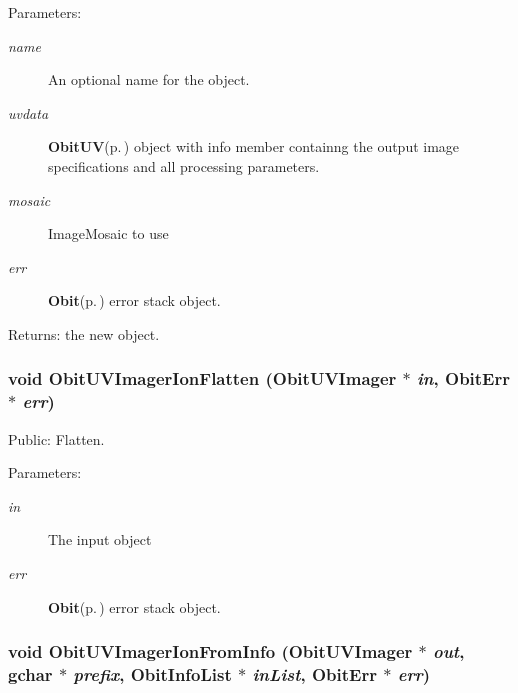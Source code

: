 \begin{Desc}
\item[Parameters:]
\begin{description}
\item[{\em name}]An optional name for the object. \item[{\em uvdata}]{\bf Obit\-UV}{\rm (p.\,\pageref{structObitUV})} object with info member containng the output image specifications and all processing parameters. \item[{\em mosaic}]Image\-Mosaic to use \item[{\em err}]{\bf Obit}{\rm (p.\,\pageref{structObit})} error stack object. \end{description}
\end{Desc}
\begin{Desc}
\item[Returns:]the new object. \end{Desc}
\subsubsection{\setlength{\rightskip}{0pt plus 5cm}void Obit\-UVImager\-Ion\-Flatten ({\bf Obit\-UVImager} $\ast$ {\em in}, {\bf Obit\-Err} $\ast$ {\em err})}\label{ObitUVImagerIon_8h_a13}


Public: Flatten. 

\begin{Desc}
\item[Parameters:]
\begin{description}
\item[{\em in}]The input object \item[{\em err}]{\bf Obit}{\rm (p.\,\pageref{structObit})} error stack object. \end{description}
\end{Desc}
\subsubsection{\setlength{\rightskip}{0pt plus 5cm}void Obit\-UVImager\-Ion\-From\-Info ({\bf Obit\-UVImager} $\ast$ {\em out}, gchar $\ast$ {\em prefix}, {\bf Obit\-Info\-List} $\ast$ {\em in\-List}, {\bf Obit\-Err} $\ast$ {\em err})}\label{ObitUVImagerIon_8h_a5}


